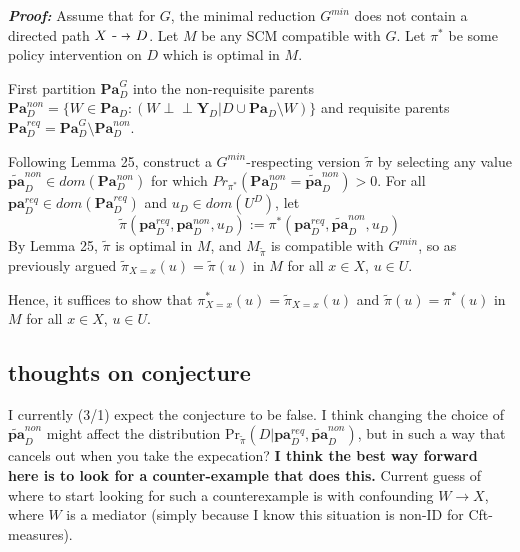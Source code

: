 \documentclass[letterpaper,10pt]{article}
\newcommand\dashto{\mathrel{
  -\mkern-6mu{\to}\mkern-20mu{\color{white}\bullet}\mkern12mu
}}
\newcommand\indep{\perp \!\!\! \perp}
\begin{document}
\textbf{\emph{Proof:}}
Assume that for $G$, the minimal reduction $G^{min}$ does not contain a directed path $X\dashto D$.
Let $M$ be any SCM compatible with $G$. 
Let $\pi^*$ be some policy intervention on $D$ which is optimal in $M$.

First partition $\mathbf{Pa}_D^G$ into the non-requisite parents $\mathbf{Pa}^{non}_D=\{W\in \mathbf{Pa}_D : (W\indep \mathbf{Y}_D | D \cup \mathbf{Pa}_D \setminus W)\}$ and requisite parents $\mathbf{Pa}_D^{req}=\mathbf{Pa}_D^G\setminus\mathbf{Pa}^{non}_D$.



Following Lemma 25, construct a $G^{min}$-respecting version $\tilde{\pi}$ by selecting any value $\mathbf{\tilde{pa}}^{non}_D \in dom(\mathbf{Pa}^{non}_D)$ for which $Pr_{\pi^*}(\mathbf{Pa}^{non}_D = \mathbf{\tilde{pa}}^{non}_D)>0$.
For all $\mathbf{pa}_D^{req} \in dom(\mathbf{Pa}_D^{req})$ and $u_D \in dom(U^D)$, let
\[
\tilde{\pi}(\mathbf{pa}_D^{req},\mathbf{pa}^{non}_D,u_D) := \pi^*(\mathbf{pa}_D^{req},\mathbf{\tilde{pa}}^{non}_D,u_D)
\]
By Lemma 25, $\tilde{\pi}$ is optimal in $M$, and $M_{\tilde{\pi}}$ is compatible with $G^{min}$, so as previously argued $\tilde{\pi}_{X=x}(u)=\tilde{\pi}(u)$ in $M$ for all $x\in X$, $u\in U$. 

Hence, it suffices to show that $\pi^*_{X=x}(u)=\tilde{\pi}_{X=x}(u)$ and $\tilde{\pi}(u)=\pi^*(u)$ in $M$ for all $x\in X$, $u\in U$. 



\subsection{thoughts on conjecture}
I currently (3/1) expect the conjecture to be false. I think changing the choice of $\mathbf{\tilde{pa}}^{non}_D$ might affect the distribution $\text{Pr}_{\tilde{\pi}} (D|\mathbf{pa}_D^{req},\mathbf{\tilde{pa}}^{non}_D)$, but in such a way that cancels out when you take the expecation? 
\textbf{I think the best way forward here is to look for a counter-example that does this.}
Current guess of where to start looking for such a counterexample is with confounding $W\to X$, where $W$ is a mediator (simply because I know this situation is non-ID for Cft-measures).
\end{document}
